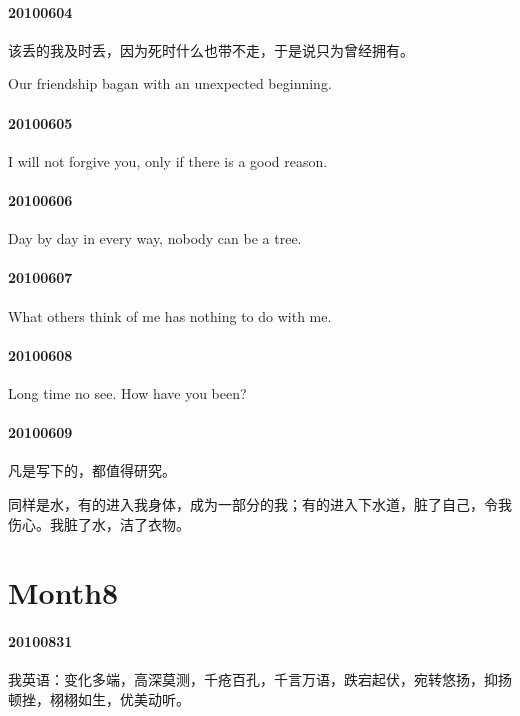\documentclass[UTF8]{book}
\begin{document}
\paragraph{20100604}

该丢的我及时丢，因为死时什么也带不走，于是说只为曾经拥有。

Our friendship bagan with an unexpected beginning.


\paragraph{20100605}

I will not forgive you, only if there is a good reason.


\paragraph{20100606}

Day by day in every way, nobody can be a tree.


\paragraph{20100607}

What others think of me has nothing to do with me.


\paragraph{20100608}

Long time no see. How have you been?


\paragraph{20100609}

凡是写下的，都值得研究。

同样是水，有的进入我身体，成为一部分的我；有的进入下水道，脏了自己，令我伤心。我脏了水，洁了衣物。


\section{Month8}
\paragraph{20100831}

我英语：变化多端，高深莫测，千疮百孔，千言万语，跌宕起伏，宛转悠扬，抑扬顿挫，栩栩如生，优美动听。 
\end{document}
